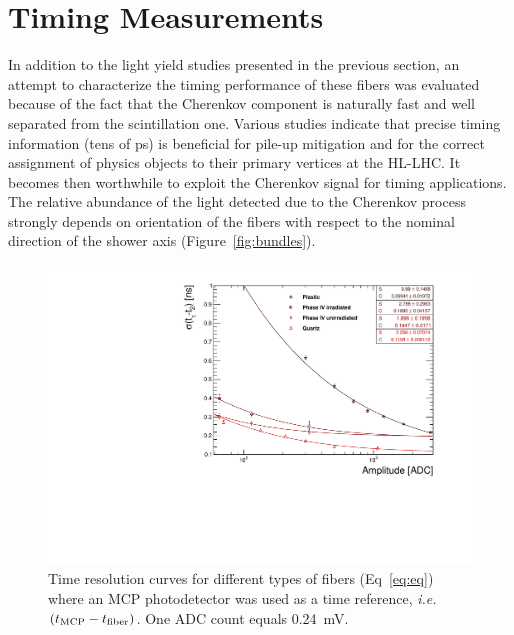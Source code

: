 \documentclass[a4paper,11pt]{article}
\begin{document}
\section{Timing Measurements}
\label{sec:timing}
In addition to the light yield studies presented in the previous section, an attempt to characterize the timing performance of these fibers was evaluated because of the fact that the Cherenkov component is naturally fast and well separated from the scintillation one. Various studies indicate that precise timing information (tens of ps) is beneficial for pile-up mitigation and for the correct assignment of physics objects to their primary vertices at the HL-LHC. It becomes then worthwhile to exploit the Cherenkov signal for timing applications.  The relative abundance of the light detected due to the Cherenkov process  strongly depends on orientation of the fibers with respect to the nominal direction of the shower axis (Figure~\ref{fig:bundles}). 

\begin{figure}[ht]
\begin{center}
      \includegraphics[width=12cm]{Figures/fibres_time_res}
\caption{\small Time resolution curves for different types of fibers (Eq~\ref{eq:eq}) where an MCP photodetector was used as a time reference, {\it i.e.} $(t_{\rm MCP} - t_{\rm fiber})$.  One ADC count equals 0.24~mV.}
    \label{fig:fibres_time_res}
\end{center}
\end{figure}
\end{document}
